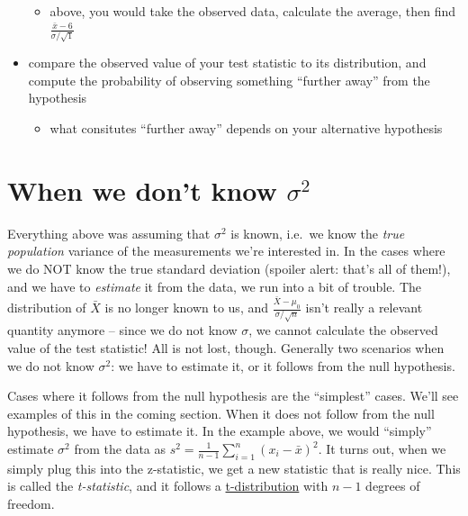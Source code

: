 \documentclass[]{book}
\providecommand{\tightlist}{%
  \setlength{\itemsep}{0pt}\setlength{\parskip}{0pt}}
\theoremstyle{definition}
\theoremstyle{definition}
\theoremstyle{definition}
\theoremstyle{remark}
\begin{document}
\begin{itemize}
  \begin{itemize}
  \tightlist
  \item
    above, you would take the observed data, calculate the average, then find \(\frac{\bar{x} - 6}{\sigma/\sqrt{1}}\)
  \end{itemize}
\item
  compare the observed value of your test statistic to its distribution, and compute the probability of observing something ``further away'' from the hypothesis

  \begin{itemize}
  \tightlist
  \item
    what consitutes ``further away'' depends on your alternative hypothesis
  \end{itemize}
\end{itemize}

\hypertarget{when-we-dont-know-sigma2}{%
\section{\texorpdfstring{When we don't know \(\sigma^2\)}{When we don't know \textbackslash sigma\^{}2}}\label{when-we-dont-know-sigma2}}

Everything above was assuming that \(\sigma^2\) is known, i.e.~we know the \emph{true population} variance of the measurements we're interested in. In the cases where we do NOT know the true standard deviation (spoiler alert: that's all of them!), and we have to \emph{estimate} it from the data, we run into a bit of trouble. The distribution of \(\bar{X}\) is no longer known to us, and \(\frac{\bar{X} - \mu_0}{\sigma/\sqrt{n}}\) isn't really a relevant quantity anymore -- since we do not know \(\sigma\), we cannot calculate the observed value of the test statistic! All is not lost, though. Generally two scenarios when we do not know \(\sigma^2\): we have to estimate it, or it follows from the null hypothesis.

Cases where it follows from the null hypothesis are the ``simplest'' cases. We'll see examples of this in the coming section. When it does not follow from the null hypothesis, we have to estimate it. In the example above, we would ``simply'' estimate \(\sigma^2\) from the data as \(s^2 = \frac{1}{n-1}\sum_{i=1}^n (x_i - \bar{x})^2\). It turns out, when we simply plug this into the z-statistic, we get a new statistic that is really nice. This is called the \emph{t-statistic}, and it follows a \protect\hyperlink{t-distribution}{t-distribution} with \(n-1\) degrees of freedom.
\end{document}
